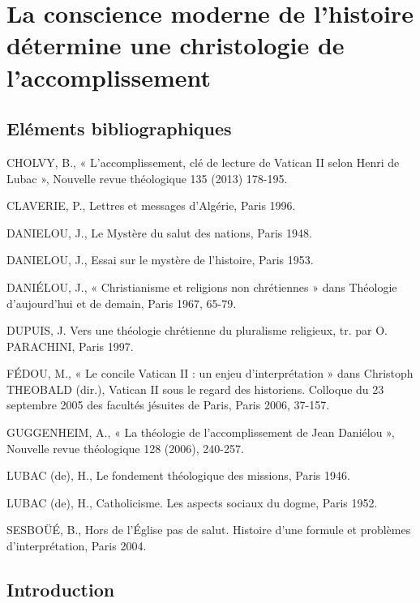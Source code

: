 \chapter{La conscience moderne de l’histoire détermine une christologie de l’accomplissement}





\section{Eléments bibliographiques} 

CHOLVY, B., « L’accomplissement, clé de lecture de Vatican II selon Henri de Lubac », Nouvelle revue théologique 135 (2013) 178-195. 

CLAVERIE, P.,  Lettres et messages d’Algérie, Paris 1996. 

DANIELOU, J., Le Mystère du salut des nations, Paris 1948. 

DANIELOU, J., Essai sur le mystère de l’histoire, Paris 1953. 

DANIÉLOU, J., « Christianisme et religions non chrétiennes » dans Théologie d’aujourd’hui et de demain, Paris 1967, 65-79. 

DUPUIS, J. Vers une théologie chrétienne du pluralisme religieux, tr. par O. PARACHINI, Paris 1997.  

FÉDOU, M., « Le concile Vatican II : un enjeu d’interprétation » dans 
Christoph THEOBALD (dir.), Vatican II sous le regard des historiens. Colloque du 23 septembre 2005 des facultés jésuites de Paris, Paris 2006, 37-157. 

GUGGENHEIM, A., « La théologie de l’accomplissement de Jean Daniélou », Nouvelle revue théologique 128 (2006), 240-257. 

LUBAC (de), H., Le fondement théologique des missions, Paris 1946. 

LUBAC (de), H., Catholicisme. Les aspects sociaux du dogme, Paris 1952. 

SESBOÜÉ, B., Hors de l’Église pas de salut. Histoire d’une formule et problèmes d’interprétation, Paris 2004. 


\section{Introduction }

